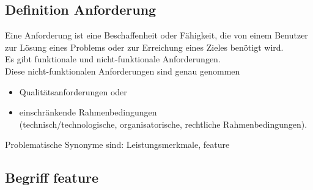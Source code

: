 \documentclass{scrreprt}
\begin{document}
\subsection{Definition Anforderung}\parskp
Eine Anforderung ist eine Beschaffenheit oder Fähigkeit, die von einem Benutzer zur Lösung eines Problems oder zur Erreichung eines Zieles benötigt wird.\\
Es gibt funktionale und nicht-funktionale Anforderungen.\\
Diese nicht-funktionalen Anforderungen sind genau genommen
\begin{itemize}
\item Qualitätsanforderungen oder
\item einschränkende Rahmenbedingungen\\
(technisch/technologische, organisatorische, rechtliche Rahmenbedingungen).
\end{itemize}
Problematische Synonyme sind: Leistungsmerkmale, feature

\subsection{Begriff feature}
\end{document}

